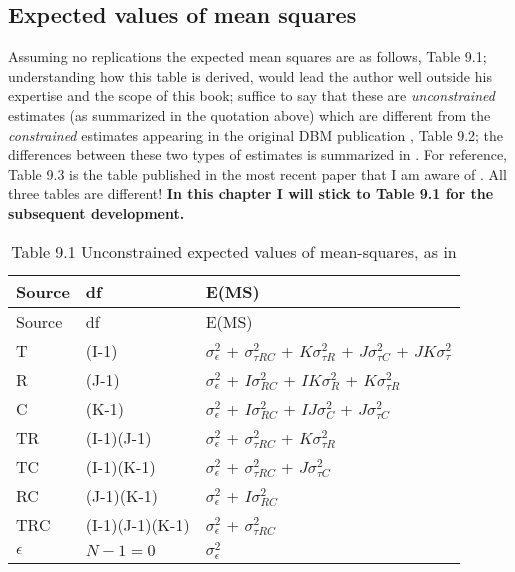 \documentclass[
]{book}
\begin{document}
\hypertarget{expected-values-of-mean-squares-1}{%
\subsection{Expected values of mean squares}\label{expected-values-of-mean-squares-1}}

Assuming no replications the expected mean squares are as follows, Table 9.1; understanding how this table is derived, would lead the author well outside his expertise and the scope of this book; suffice to say that these are \emph{unconstrained} estimates (as summarized in the quotation above) which are different from the \emph{constrained} estimates appearing in the original DBM publication \citep{RN204}, Table 9.2; the differences between these two types of estimates is summarized in \citep{RN2079}. For reference, Table 9.3 is the table published in the most recent paper that I am aware of \citep{RN2508}. All three tables are different! \textbf{In this chapter I will stick to Table 9.1 for the subsequent development.}

\begin{longtable}[]{@{}lll@{}}
\caption{Table 9.1 Unconstrained expected values of mean-squares, as in \citep{RN2079}}\tabularnewline
\toprule
Source & df & E(MS)\tabularnewline
\midrule
\endfirsthead
\toprule
Source & df & E(MS)\tabularnewline
\midrule
\endhead
T & (I-1) & \(\sigma_{\epsilon}^{2}\) + \(\sigma_{\tau RC}^{2}\) + \(K\sigma_{\tau R}^{2}\) + \(J\sigma_{\tau C}^{2}\) + \(JK\sigma_{\tau}^{2}\)\tabularnewline
R & (J-1) & \(\sigma_{\epsilon}^{2}\) + \(I\sigma_{RC}^{2}\) + \(IK\sigma_{R}^{2}\) + \(K\sigma_{\tau R}^{2}\)\tabularnewline
C & (K-1) & \(\sigma_{\epsilon}^{2}\) + \(I\sigma_{RC}^{2}\) + \(IJ\sigma_{C}^{2}\) + \(J\sigma_{\tau C}^{2}\)\tabularnewline
TR & (I-1)(J-1) & \(\sigma_{\epsilon}^{2}\) + \(\sigma_{\tau RC}^{2}\) + \(K\sigma_{\tau R}^{2}\)\tabularnewline
TC & (I-1)(K-1) & \(\sigma_{\epsilon}^{2}\) + \(\sigma_{\tau RC}^{2}\) + \(J\sigma_{\tau C}^{2}\)\tabularnewline
RC & (J-1)(K-1) & \(\sigma_{\epsilon}^{2}\) + \(I\sigma_{RC}^{2}\)\tabularnewline
TRC & (I-1)(J-1)(K-1) & \(\sigma_{\epsilon}^{2}\) + \(\sigma_{\tau RC}^{2}\)\tabularnewline
\(\epsilon\) & \(N-1=0\) & \(\sigma_{\epsilon}^{2}\)\tabularnewline
\bottomrule
\end{longtable}
\end{document}
